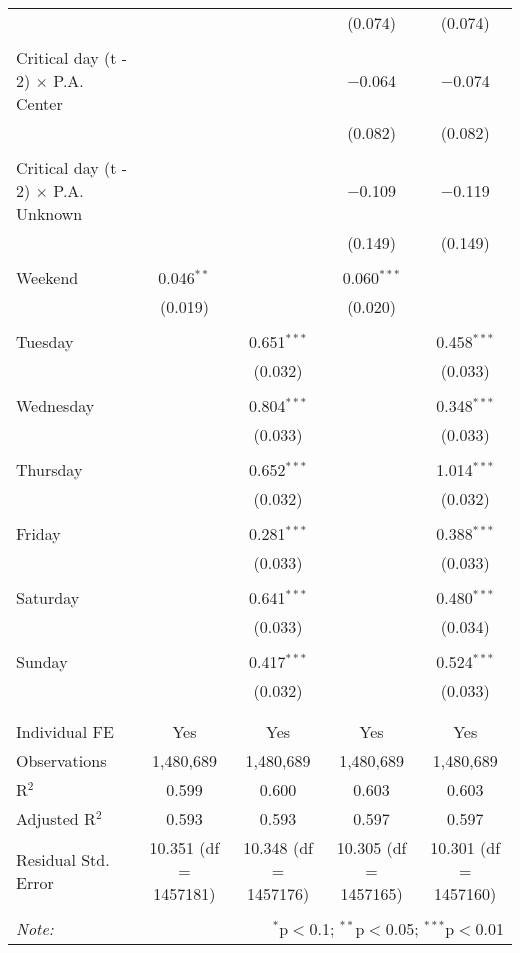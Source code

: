 \documentclass[
]{article}
\begin{document}
\begin{table}[!htbp]
{\begin{tabular}{@{\extracolsep{5pt}}lcccc}
  &  &  & (0.074) & (0.074) \\ 
  & & & & \\ 
 Critical day (t - 2) $\times$ P.A. Center &  &  & $-$0.064 & $-$0.074 \\ 
  &  &  & (0.082) & (0.082) \\ 
  & & & & \\ 
 Critical day (t - 2) $\times$ P.A. Unknown &  &  & $-$0.109 & $-$0.119 \\ 
  &  &  & (0.149) & (0.149) \\ 
  & & & & \\ 
 Weekend & 0.046$^{**}$ &  & 0.060$^{***}$ &  \\ 
  & (0.019) &  & (0.020) &  \\ 
  & & & & \\ 
 Tuesday &  & 0.651$^{***}$ &  & 0.458$^{***}$ \\ 
  &  & (0.032) &  & (0.033) \\ 
  & & & & \\ 
 Wednesday &  & 0.804$^{***}$ &  & 0.348$^{***}$ \\ 
  &  & (0.033) &  & (0.033) \\ 
  & & & & \\ 
 Thursday &  & 0.652$^{***}$ &  & 1.014$^{***}$ \\ 
  &  & (0.032) &  & (0.032) \\ 
  & & & & \\ 
 Friday &  & 0.281$^{***}$ &  & 0.388$^{***}$ \\ 
  &  & (0.033) &  & (0.033) \\ 
  & & & & \\ 
 Saturday &  & 0.641$^{***}$ &  & 0.480$^{***}$ \\ 
  &  & (0.033) &  & (0.034) \\ 
  & & & & \\ 
 Sunday &  & 0.417$^{***}$ &  & 0.524$^{***}$ \\ 
  &  & (0.032) &  & (0.033) \\ 
  & & & & \\ 
\hline \\[-1.8ex] 
Individual FE & Yes & Yes & Yes & Yes \\ 
Observations & 1,480,689 & 1,480,689 & 1,480,689 & 1,480,689 \\ 
R$^{2}$ & 0.599 & 0.600 & 0.603 & 0.603 \\ 
Adjusted R$^{2}$ & 0.593 & 0.593 & 0.597 & 0.597 \\ 
Residual Std. Error & 10.351 (df = 1457181) & 10.348 (df = 1457176) & 10.305 (df = 1457165) & 10.301 (df = 1457160) \\ 
\hline 
\hline \\[-1.8ex] 
\textit{Note:}  & \multicolumn{4}{r}{$^{*}$p$<$0.1; $^{**}$p$<$0.05; $^{***}$p$<$0.01} \\ 
\end{tabular}
} 
\end{table} 
\newpage
\end{document}

